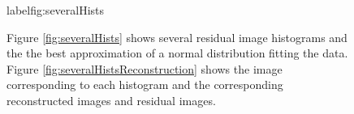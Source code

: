 \begin{figure}
	\centering
	
	
		\caption[Several residual image histograms.]{Figure \ref{fig:severalHists} shows several residual image histograms and the the best approximation of a normal distribution fitting the data.  Figure \ref{fig:severalHistsReconstruction} shows the image corresponding to each histogram and the corresponding reconstructed images and residual images.}
		label{fig:severalHists}
\end{figure}



